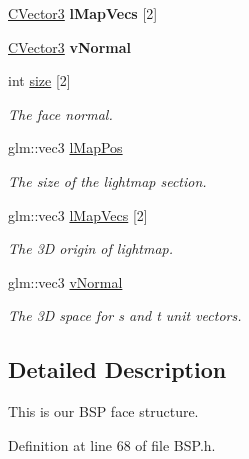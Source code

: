 \begin{DoxyCompactItemize}
\item 
\hyperlink{struct_c_vector3}{C\+Vector3} {\bfseries l\+Map\+Vecs} \mbox{[}2\mbox{]}\hypertarget{structt_b_s_p_face_a1a1653c5c6e46740316f75c5dd5886d9}{}\label{structt_b_s_p_face_a1a1653c5c6e46740316f75c5dd5886d9}

\item 
\hyperlink{struct_c_vector3}{C\+Vector3} {\bfseries v\+Normal}\hypertarget{structt_b_s_p_face_a2d96061fcb691c47b49fb852799d0404}{}\label{structt_b_s_p_face_a2d96061fcb691c47b49fb852799d0404}

\item 
int \hyperlink{structt_b_s_p_face_ac43106a7e101d67d6bc4fffe8d706b1b}{size} \mbox{[}2\mbox{]}\hypertarget{structt_b_s_p_face_ac43106a7e101d67d6bc4fffe8d706b1b}{}\label{structt_b_s_p_face_ac43106a7e101d67d6bc4fffe8d706b1b}

\begin{DoxyCompactList}\small\item\em The face normal. \end{DoxyCompactList}\item 
glm\+::vec3 \hyperlink{structt_b_s_p_face_ae4c3e600f41679982e92e7ec1a04d08f}{l\+Map\+Pos}\hypertarget{structt_b_s_p_face_ae4c3e600f41679982e92e7ec1a04d08f}{}\label{structt_b_s_p_face_ae4c3e600f41679982e92e7ec1a04d08f}

\begin{DoxyCompactList}\small\item\em The size of the lightmap section. \end{DoxyCompactList}\item 
glm\+::vec3 \hyperlink{structt_b_s_p_face_acdb598e4743f0ef9256bcd8570ce3c04}{l\+Map\+Vecs} \mbox{[}2\mbox{]}\hypertarget{structt_b_s_p_face_acdb598e4743f0ef9256bcd8570ce3c04}{}\label{structt_b_s_p_face_acdb598e4743f0ef9256bcd8570ce3c04}

\begin{DoxyCompactList}\small\item\em The 3D origin of lightmap. \end{DoxyCompactList}\item 
glm\+::vec3 \hyperlink{structt_b_s_p_face_a83b331a4870c485a46b47395e1ad5b11}{v\+Normal}\hypertarget{structt_b_s_p_face_a83b331a4870c485a46b47395e1ad5b11}{}\label{structt_b_s_p_face_a83b331a4870c485a46b47395e1ad5b11}

\begin{DoxyCompactList}\small\item\em The 3D space for s and t unit vectors. \end{DoxyCompactList}\end{DoxyCompactItemize}


\subsection{Detailed Description}
This is our B\+SP face structure. 

Definition at line 68 of file B\+S\+P.\+h.

